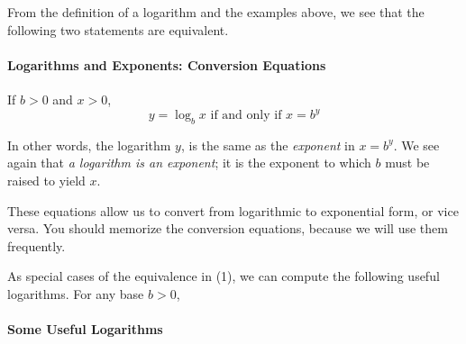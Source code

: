 \documentclass[10pt,]{book}
\theoremstyle{plain}
\theoremstyle{definition}
\theoremstyle{definition}
\theoremstyle{definition}
\newcommand{\gt}{ > }
\begin{document}
	From the definition of a logarithm and the examples above, we see that the following two statements are equivalent.
%
\typeout{************************************************}
\typeout{************************************************}
\paragraph[Logarithms and Exponents: Conversion Equations]{Logarithms and Exponents: Conversion Equations}\label{paragraphs-1}

	If \(b \gt 0\) and \(x \gt 0\),
	\begin{equation*}y = \log_b x \text{ if and only if } x = b^y\end{equation*}
%
\par

	In other words, the logarithm \(y\), is the same as the \emph{exponent} in \(x = b^y\). We see again that \emph{a logarithm is an exponent}; it is the exponent to which \(b\) must be raised to yield \(x\).
%
\par

	These equations allow us to convert from logarithmic to exponential form, or vice versa. You should memorize the conversion equations, because we will use them frequently. 
%
\par

	As special cases of the equivalence in (1), we can compute the following useful logarithms.
For any base \(b \gt 0\),
%
\typeout{************************************************}
\typeout{************************************************}
\paragraph[Some Useful Logarithms]{Some Useful Logarithms}\label{paragraphs-2}
\end{document}
